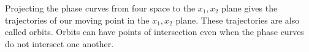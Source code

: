 Projecting the phase curves from four space to the $x_1, x_2$ plane gives the trajectories of our moving point in the $x_1, x_2$ plane. These trajectories are also called orbits. Orbits can have points of intersection even when the phase curves do not intersect one another.
